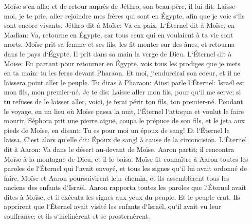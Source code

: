 \verse Moïse s`en alla; et de retour auprès de Jéthro, son beau-père, il lui dit: Laisse-moi, je te prie, aller rejoindre mes frères qui sont en Égypte, afin que je voie s`ils sont encore vivants. Jéthro dit à Moïse: Va en paix. 
\verse L`Éternel dit à Moïse, en Madian: Va, retourne en Égypte, car tous ceux qui en voulaient à ta vie sont morts. 
\verse Moïse prit sa femme et ses fils, les fit monter sur des ânes, et retourna dans le pays d`Égypte. Il prit dans sa main la verge de Dieu. 
\verse L`Éternel dit à Moïse: En partant pour retourner en Égypte, vois tous les prodiges que je mets en ta main: tu les feras devant Pharaon. Et moi, j`endurcirai son coeur, et il ne laissera point aller le peuple. 
\verse Tu diras à Pharaon: Ainsi parle l`Éternel: Israël est mon fils, mon premier-né. 
\verse Je te dis: Laisse aller mon fils, pour qu`il me serve; si tu refuses de le laisser aller, voici, je ferai périr ton fils, ton premier-né. 
\verse Pendant le voyage, en un lieu où Moïse passa la nuit, l`Éternel l`attaqua et voulut le faire mourir. 
\verse Séphora prit une pierre aiguë, coupa le prépuce de son fils, et le jeta aux pieds de Moïse, en disant: Tu es pour moi un époux de sang! 
\verse Et l`Éternel le laissa. C`est alors qu`elle dit: Époux de sang! à cause de la circoncision. 
\verse L`Éternel dit à Aaron: Va dans le désert au-devant de Moïse. Aaron partit; il rencontra Moïse à la montagne de Dieu, et il le baisa. 
\verse Moïse fit connaître à Aaron toutes les paroles de l`Éternel qui l`avait envoyé, et tous les signes qu`il lui avait ordonné de faire. 
\verse Moïse et Aaron poursuivirent leur chemin, et ils assemblèrent tous les anciens des enfants d`Israël. 
\verse Aaron rapporta toutes les paroles que l`Éternel avait dites à Moïse, et il exécuta les signes aux yeux du peuple. 
\verse Et le peuple crut. Ils apprirent que l`Éternel avait visité les enfants d`Israël, qu`il avait vu leur souffrance; et ils s`inclinèrent et se prosternèrent. 

